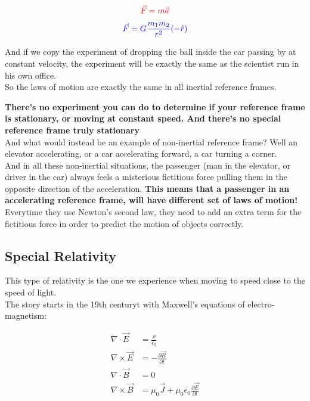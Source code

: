 \begin{equation}
    \color{red}\vec{F} = m \vec{a}
\end{equation}
\begin{equation}
\color{blue}\vec{F} = G \frac{m_1 m_2}{r^2}(-\hat{r})
\end{equation}

And if we copy the experiment of dropping the ball inside the car passing by at constant velocity, the experiment 
will be exactly the same as the scientist run in his own office.\\
So the laws of motion are exactly the same in all inertial reference frames.

\textbf{There's no experiment you can do to determine if your reference frame is stationary, or moving at constant speed. And there's no special reference frame truly stationary}\\

And what would instead be an example of non-inertial reference frame? Well an elevator accelerating, or a car 
accelerating forward, a car turning a corner.\\
And in all these non-inertial situations, the passenger (man in the elevator, or driver in the car) always feels a misterious fictitious force 
pulling them in the opposite direction of the acceleration.
\textbf{This means that a passenger in an accelerating reference frame, will have different set of laws of motion!}
Everytime they use Newton's second law, they need to add an extra term for the fictitious force in order to predict the motion
of objects correctly.\\

\subsection{Special Relativity}

This type of relativity is the one we experience when moving to speed close to the speed of light.\\

The story starts in the 19th centuryt with Maxwell's equations of electro-magnetism:

\begin{align*}
    \nabla \cdot \vec{E} &= \frac{\rho}{\epsilon_0}\\
    \nabla \times \vec{E} &= -\frac{\partial \vec{B}}{\partial t}\\
    \nabla \cdot \vec{B} &= 0\\
    \nabla \times \vec{B} &= \mu_0 \vec{J} + \mu_0 \epsilon_0 \frac{\partial \vec{E}}{\partial t}
\end{align*}

